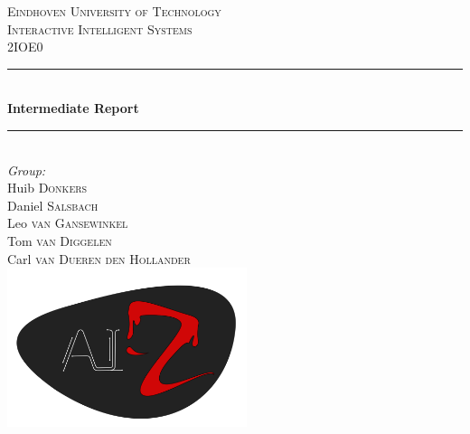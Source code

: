 \documentclass[12pt]{report}
\begin{document}
\begin{titlepage}

\newcommand{\HRule}{\rule{\linewidth}{0.5mm}} %

\center %
 

\textsc{\LARGE Eindhoven University of Technology}\\[1.5cm] %
\textsc{\Large Interactive Intelligent Systems}\\[0.5cm] %
\textsc{\large 2IOE0}\\[0.5cm] %


\HRule \\[0.4cm]
{ \huge \bfseries Intermediate Report}\\[0.4cm] %
\HRule \\[1.5cm]
 

\Large \emph{Group:}\\
Huib \textsc{Donkers}\\ %
Daniel \textsc{Salsbach}\\ %
Leo \textsc{van Gansewinkel}\\ %
Tom \textsc{van Diggelen}\\ %
Carl \textsc{van Dueren den Hollander}\\[.25cm] %


\includegraphics[width=7cm]{../AIZlogo.png}\\[.25cm] %
 

\end{titlepage}
\end{document}
